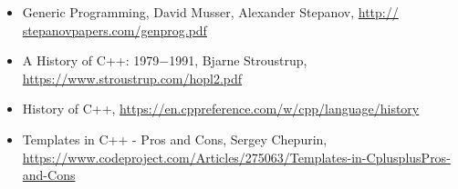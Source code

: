 \begin{itemize}
\item
Generic Programming, David Musser, Alexander Stepanov, \url{http:// stepanovpapers.com/genprog.pdf}

\item
A History of C++: 1979−1991, Bjarne Stroustrup, \url{https://www.stroustrup.com/hopl2.pdf}

\item
History of C++, \url{https://en.cppreference.com/w/cpp/language/history}

\item
Templates in C++ - Pros and Cons, Sergey Chepurin, \url{https://www.codeproject.com/Articles/275063/Templates-in-CplusplusPros-and-Cons}
\end{itemize}